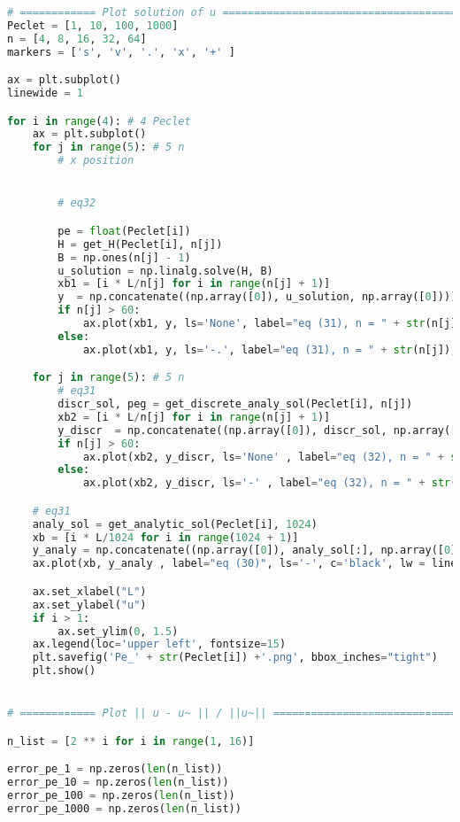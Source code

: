 \documentclass[11pt,letterpaper]{article}
\begin{document}
\begin{lstlisting}[language=Python, caption=Qusetion 1 Python code]
# ============ Plot solution of u =====================================
Peclet = [1, 10, 100, 1000]
n = [4, 8, 16, 32, 64]
markers = ['s', 'v', '.', 'x', '+' ]

ax = plt.subplot()
linewide = 1

for i in range(4): # 4 Peclet
    ax = plt.subplot()
    for j in range(5): # 5 n
        # x position


        # eq32

        pe = float(Peclet[i])
        H = get_H(Peclet[i], n[j])
        B = np.ones(n[j] - 1)
        u_solution = np.linalg.solve(H, B)
        xb1 = [i * L/n[j] for i in range(n[j] + 1)]
        y  = np.concatenate((np.array([0]), u_solution, np.array([0])))
        if n[j] > 60:
            ax.plot(xb1, y, ls='None', label="eq (31), n = " + str(n[j]), c='r', marker=markers[j] , lw = linewide)
        else:
            ax.plot(xb1, y, ls='-.', label="eq (31), n = " + str(n[j]), c='r', marker=markers[j] , lw = linewide)

    for j in range(5): # 5 n
        # eq31
        discr_sol, peg = get_discrete_analy_sol(Peclet[i], n[j])
        xb2 = [i * L/n[j] for i in range(n[j] + 1)]
        y_discr  = np.concatenate((np.array([0]), discr_sol, np.array([0])))
        if n[j] > 60:
            ax.plot(xb2, y_discr, ls='None' , label="eq (32), n = " + str(n[j]) + r", $Pe_g = $" + str(peg), c='tab:blue', marker=markers[j], lw = linewide)
        else:
            ax.plot(xb2, y_discr, ls='-' , label="eq (32), n = " + str(n[j]) + r", $Pe_g = $" + str(peg), c='tab:blue', marker=markers[j], lw = linewide)

    # eq31
    analy_sol = get_analytic_sol(Peclet[i], 1024)
    xb = [i * L/1024 for i in range(1024 + 1)]
    y_analy = np.concatenate((np.array([0]), analy_sol[:], np.array([0])))
    ax.plot(xb, y_analy , label="eq (30)", ls='-', c='black', lw = linewide)

    ax.set_xlabel("L")
    ax.set_ylabel("u")
    if i > 1:
        ax.set_ylim(0, 1.5)
    ax.legend(loc='upper left', fontsize=15)
    plt.savefig('Pe_' + str(Peclet[i]) +'.png', bbox_inches="tight")
    plt.show()


# ============ Plot || u - u~ || / ||u~|| =============================

n_list = [2 ** i for i in range(1, 16)]

error_pe_1 = np.zeros(len(n_list))
error_pe_10 = np.zeros(len(n_list))
error_pe_100 = np.zeros(len(n_list))
error_pe_1000 = np.zeros(len(n_list))


\end{lstlisting}
\end{document}
